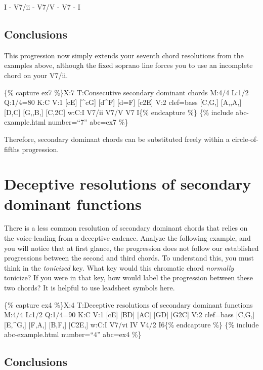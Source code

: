 \documentclass{book}
\begin{document}
I - V7/ii - V7/V - V7 - I

\hypertarget{conclusions-53}{%
\subsection{Conclusions}\label{conclusions-53}}

This progression now simply extends your seventh chord resolutions from the
examples above, although the fixed soprano line forces you to use an
incomplete chord on your V7/ii.

\{\% capture ex7 \%\}X:7 T:Consecutive secondary dominant chords M:4/4 L:1/2
Q:1/4=80 K:C V:1 {[}cE{]} {[}\^{}cG{]}\textbar{} {[}d\^{}F{]}
{[}d=F{]}\textbar{} {[}c2E{]}\textbar{]} V:2 clef=bass {[}C,G,{]}
{[}A,,A,{]}\textbar{} {[}D,C{]} {[}G,,B,{]}\textbar{} {[}C,2C{]}\textbar{]}
w:C:I V7/ii V7/V V7 I\{\% endcapture \%\} \{\% include abc-example.html
number=``7'' abc=ex7 \%\}

Therefore, secondary dominant chords can be substituted freely within a
circle-of-fifths progression.

\hypertarget{deceptive-resolutions-of-secondary-dominant-functions}{%
\section{Deceptive resolutions of secondary dominant
functions}\label{deceptive-resolutions-of-secondary-dominant-functions}}

There is a less common resolution of secondary dominant chords that relies on
the voice-leading from a deceptive cadence. Analyze the following example, and
you will notice that at first glance, the progression does not follow our
established progressions between the second and third chords. To understand
this, you must think in the \emph{tonicized} key. What key would this
chromatic chord \emph{normally} tonicize? If you were in that key, how would
label the progression between these two chords? It is helpful to use leadsheet
symbols here.

\{\% capture ex4 \%\}X:4 T:Deceptive resolutions of secondary dominant
functions M:4/4 L:1/2 Q:1/4=90 K:C V:1 {[}cE{]} {[}BD{]}\textbar{} {[}AC{]}
{[}GD{]}\textbar{} {[}G2C{]}\textbar{]} V:2 clef=bass {[}C,G,{]}
{[}E,\^{}G,{]}\textbar{} {[}F,A,{]} {[}B,F,{]}\textbar{} {[}C2E,{]}\textbar{]}
w:C:I V7/vi IV V4/2 I6\{\% endcapture \%\} \{\% include abc-example.html
number=``4'' abc=ex4 \%\}

\hypertarget{conclusions-54}{%
\subsection{Conclusions}\label{conclusions-54}}
\end{document}
